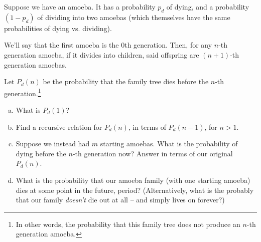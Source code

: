 \begin{problem}
\begin{enumerate}[(a)]





\end{enumerate}
\end{problem}



\begin{problem}
\label{pr:amoeba-ngen}
Suppose we have an amoeba. It has a probability $p_d$ of dying, and a probability $(1 - p_d)$ of dividing into two amoebas (which themselves have the same probabilities of dying vs. dividing). 

We'll say that the first amoeba is the 0th generation. Then, for any $n$-th generation amoeba, if it divides into children, said offspring are $(n+1)$-th generation amoebas. 

Let $P_d(n)$ be the probability that the family tree dies before the $n$-th generation.\footnote{In other words, the probability that this family tree does not produce an $n$-th generation amoeba.}


\begin{enumerate}[(a)]
\item What is $P_d(1)$?
\item Find a recursive relation for $P_d(n)$, in terms of $P_d(n-1)$, for $n > 1$. 
\item Suppose we instead had $m$ starting amoebas. What is the probability of dying before the $n$-th generation now? Answer in terms of our original $P_d(n)$.
\item What is the probability that our amoeba family (with one starting amoeba) dies at some point in the future, period? (Alternatively, what is the probably that our family \emph{doesn't} die out at all -- and simply lives on forever?) %
\end{enumerate}
\hfill
\end{problem}


